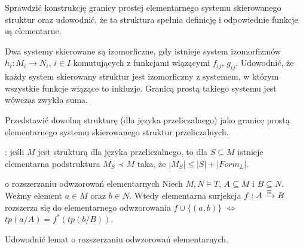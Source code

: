 \begin{zadanie}
  Sprawdzić konstrukcję granicy prostej elementarnego systemu skierowanego struktur oraz udowodnić, że ta struktura spełnia definicję i odpowiednie funkcje są elementarne.
\end{zadanie}

\begin{zadanie}
  Dwa systemy skierowane są izomorficzne, gdy istnieje system izomorfizmów $h_i:M_i\to N_i$, $i\in I$ komutujących z funkcjami wiązącymi $f_{ij}$, $g_{ij}$. Udowodnić, że każdy system skierowany struktur jest izomorficzny z systemem, w którym wszystkie funkcje wiązące to inkluzje. Granicą prostą takiego systemu jest wówczas zwykła suma.
\end{zadanie}

\begin{zadanie}
  Przedstawić dowolną strukturę (dla języka przeliczalnego) jako granicę prostą elementarnego systemu skierowanego struktur przeliczalnych.
\end{zadanie}

: jeśli $M$ jest strukturą dla języka przeliczalnego, to dla $S\subseteq M$ istnieje elementarna podstruktura $M_S\prec M$ taka, że $|M_S|\leq |S|+|Form_L|$. 

\begin{lemma}{o rozszerzaniu odwzorowań elementarnych}{}
  Niech $M,N\models T$, $A\subseteq M$ i $B\subseteq N$. Weźmy element $a\in M$ oraz $b\in N$. Wtedy elementarna surjekcja $f:A\xrightarrow{\equiv} B$ rozszerza się do elementarnego odwzorowania $f\cup\{(a,b)\}$ $\iff$ $tp(a/A)=f^*(tp(b/B))$.
\end{lemma}

\begin{zadanie}
  Udowodnić lemat o rozszerzaniu odwzorowań elementarnych.
\end{zadanie}






